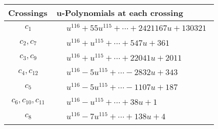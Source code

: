 \documentclass[1p]{elsarticle_modified}
\theoremstyle{definition}
\begin{document}
\begin{tabular}{m{50pt}|m{274pt}}
Crossings & \hspace{64pt}u-Polynomials at each crossing \\
\hline $$\begin{aligned}c_{1}\end{aligned}$$&$\begin{aligned}
&u^{116}+55 u^{115}+\cdots+2421167 u+130321
\end{aligned}$\\
\hline $$\begin{aligned}c_{2},c_{7}\end{aligned}$$&$\begin{aligned}
&u^{116}+u^{115}+\cdots+547 u+361
\end{aligned}$\\
\hline $$\begin{aligned}c_{3},c_{9}\end{aligned}$$&$\begin{aligned}
&u^{116}+u^{115}+\cdots+22041 u+2011
\end{aligned}$\\
\hline $$\begin{aligned}c_{4},c_{12}\end{aligned}$$&$\begin{aligned}
&u^{116}-5 u^{115}+\cdots-2832 u+343
\end{aligned}$\\
\hline $$\begin{aligned}c_{5}\end{aligned}$$&$\begin{aligned}
&u^{116}-5 u^{115}+\cdots-1107 u+187
\end{aligned}$\\
\hline $$\begin{aligned}c_{6},c_{10},c_{11}\end{aligned}$$&$\begin{aligned}
&u^{116}- u^{115}+\cdots+38 u+1
\end{aligned}$\\
\hline $$\begin{aligned}c_{8}\end{aligned}$$&$\begin{aligned}
&u^{116}-7 u^{115}+\cdots+138 u+4
\end{aligned}$\\
\hline
\end{tabular}\\~\\
\end{document}
